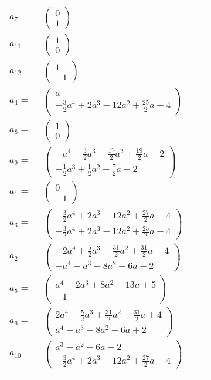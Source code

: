 \documentclass[1p]{elsarticle_modified}
\theoremstyle{definition}
\begin{document}
\begin{tabular}{m{7pt} m{180pt} m{7pt} m{180pt} }
\flushright $a_{7}=$&$\begin{pmatrix}0\\1\end{pmatrix}$ \\
\flushright $a_{11}=$&$\begin{pmatrix}1\\0\end{pmatrix}$ \\
\flushright $a_{12}=$&$\begin{pmatrix}1\\-1\end{pmatrix}$ \\
\flushright $a_{4}=$&$\begin{pmatrix}a\\-\frac{3}{2} a^4+2 a^3-12 a^2+\frac{25}{2} a-4\end{pmatrix}$ \\
\flushright $a_{8}=$&$\begin{pmatrix}1\\0\end{pmatrix}$ \\
\flushright $a_{9}=$&$\begin{pmatrix}- a^4+\frac{3}{2} a^3-\frac{17}{2} a^2+\frac{19}{2} a-2\\-\frac{1}{2} a^3+\frac{1}{2} a^2-\frac{7}{2} a+2\end{pmatrix}$ \\
\flushright $a_{1}=$&$\begin{pmatrix}0\\-1\end{pmatrix}$ \\
\flushright $a_{3}=$&$\begin{pmatrix}-\frac{3}{2} a^4+2 a^3-12 a^2+\frac{27}{2} a-4\\-\frac{3}{2} a^4+2 a^3-12 a^2+\frac{25}{2} a-4\end{pmatrix}$ \\
\flushright $a_{2}=$&$\begin{pmatrix}-2 a^4+\frac{5}{2} a^3-\frac{31}{2} a^2+\frac{31}{2} a-4\\- a^4+a^3-8 a^2+6 a-2\end{pmatrix}$ \\
\flushright $a_{5}=$&$\begin{pmatrix}a^4-2 a^3+8 a^2-13 a+5\\-1\end{pmatrix}$ \\
\flushright $a_{6}=$&$\begin{pmatrix}2 a^4-\frac{5}{2} a^3+\frac{31}{2} a^2-\frac{31}{2} a+4\\a^4- a^3+8 a^2-6 a+2\end{pmatrix}$ \\
\flushright $a_{10}=$&$\begin{pmatrix}a^3- a^2+6 a-2\\-\frac{3}{2} a^4+2 a^3-12 a^2+\frac{27}{2} a-4\end{pmatrix}$\\&\end{tabular}
\end{document}
